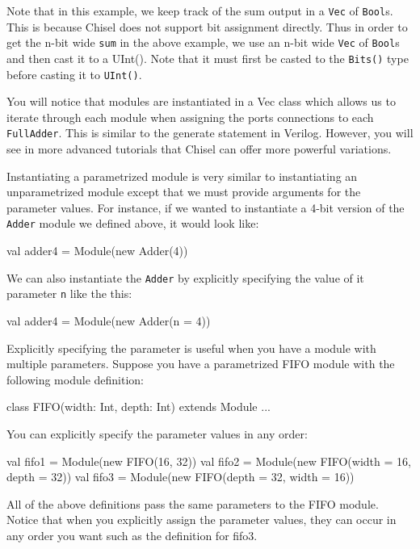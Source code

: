 Note that in this example, we keep track of the sum output in a \verb+Vec+ of \verb+Bool+s. This is because Chisel does not support bit assignment directly. Thus in order to get the n-bit wide \verb+sum+ in the above example, we use an n-bit wide \verb+Vec+ of \verb+Bool+s and then cast it to a UInt(). Note that it must first be casted to the \verb+Bits()+ type before casting it to \verb+UInt()+.

You will notice that modules are instantiated in a Vec class which allows us to iterate through each module when assigning the ports connections to each \verb+FullAdder+. This is similar to the generate statement in Verilog. However, you will see in more advanced tutorials that Chisel can offer more powerful variations.

Instantiating a parametrized module is very similar to instantiating an unparametrized module except that we must provide arguments for the parameter values. For instance, if we wanted to instantiate a 4-bit version of the \verb+Adder+ module we defined above, it would look like:

\begin{scala}
val adder4 = Module(new Adder(4))
\end{scala}

We can also instantiate the \verb+Adder+ by explicitly specifying the value of it parameter \verb+n+ like the this:

\begin{scala}
val adder4 = Module(new Adder(n = 4))
\end{scala}

Explicitly specifying the parameter is useful when you have a module with multiple parameters. Suppose you have a parametrized FIFO module with the following module definition:

\begin{scala}
class FIFO(width: Int, depth: Int) extends Module {...}
\end{scala}

You can explicitly specify the parameter values in any order:

\begin{scala}
val fifo1 = Module(new FIFO(16, 32))
val fifo2 = Module(new FIFO(width = 16, depth = 32))
val fifo3 = Module(new FIFO(depth = 32, width = 16))
\end{scala}

All of the above definitions pass the same parameters to the FIFO module. Notice that when you explicitly assign the parameter values, they can occur in any order you want such as the definition for fifo3.

